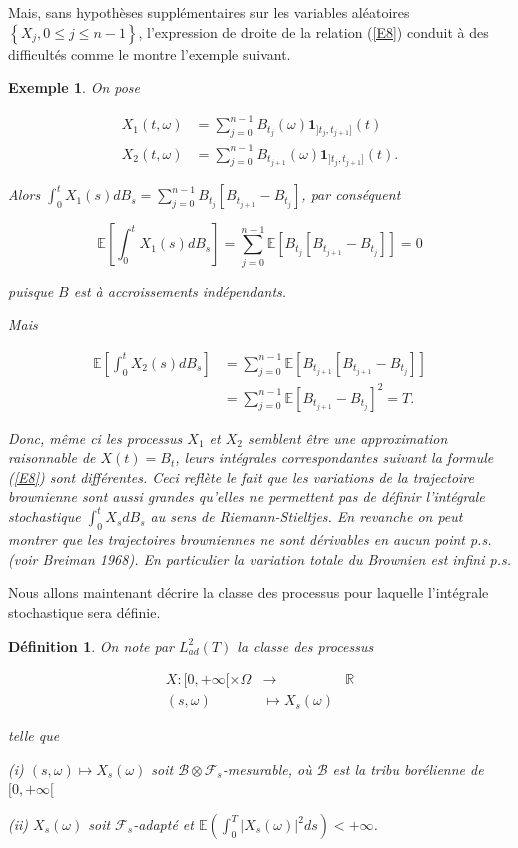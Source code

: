 \documentclass[A4paper,12pt]{report}
\newtheorem{definition}{D\'efinition}[chapter]
\newtheorem{example}{Exemple}[chapter]
\newcommand{\E}{{\mathbb{E}}}
\begin{document}
Mais, sans hypothèses supplémentaires sur les variables aléatoires $\left\{X_{j}, 0 \leq j \leq n-1\right\}$, l'expression de droite de la relation (\ref{E8}) conduit à des difficultés comme le montre l'exemple suivant.

\begin{example} On pose

$$
\begin{aligned}
X_{1}(t, \omega) & =\sum_{j=0}^{n-1} B_{t_{j}}(\omega) \mathbf{1}_{] t_{j}, t_{j+1}]}(t) \\
X_{2}(t, \omega) & =\sum_{j=0}^{n-1} B_{t_{j+1}}(\omega) \mathbf{1}_{] t_{j}, t_{j+1}]}(t) .
\end{aligned}
$$

Alors $\int_{0}^{t} X_{1}(s) d B_{s}=\sum_{j=0}^{n-1} B_{t_{j}}\left[B_{t_{j+1}}-B_{t_{j}}\right]$, par conséquent

$$
\E\left[\int_{0}^{t} X_{1}(s) d B_{s}\right]=\sum_{j=0}^{n-1} \E\left[B_{t_{j}}\left[B_{t_{j+1}}-B_{t_{j}}\right]\right]=0
$$

puisque $B$ est à accroissements indépendants.

Mais

$$
\begin{aligned}
\E\left[\int_{0}^{t} X_{2}(s) d B_{s}\right] & =\sum_{j=0}^{n-1} \E\left[B_{t_{j+1}}\left[B_{t_{j+1}}-B_{t_{j}}\right]\right] \\
& =\sum_{j=0}^{n-1} \E\left[B_{t_{j+1}}-B_{t_{j}}\right]^{2}=T .
\end{aligned}
$$

Donc, même ci les processus $X_{1}$ et $X_{2}$ semblent être une approximation raisonnable de $X(t)=B_{t}$, leurs intégrales correspondantes suivant la formule (\ref{E8}) sont différentes. Ceci reflète le fait que les variations de la trajectoire brownienne sont aussi grandes qu'elles ne permettent pas de définir l'intégrale stochastique $\int_{0}^{t} X_s d B_{s}$ au sens de Riemann-Stieltjes. En revanche on peut montrer que les trajectoires browniennes ne sont dérivables en aucun point p.s. (voir Breiman 1968). En particulier la variation totale du Brownien est infini p.s.
\end{example}
Nous allons maintenant décrire la classe des processus pour laquelle l'intégrale stochastique sera définie. 
\begin{definition}
On note par $L_{a d}^{2}(T)$ la classe des processus

$$
\begin{array}{rlc}
X:[0,+\infty[\times \Omega & \longrightarrow & \mathbb{R} \\
(s, \omega) & \longmapsto X_s(\omega)
\end{array}
$$

telle que

(i) $(s, \omega) \longmapsto X_s(\omega)$ soit $\mathcal{B} \otimes \mathcal{F}_{s}$-mesurable, où $\mathcal{B}$ est la tribu borélienne de $[0,+\infty[$

(ii) $ X_s(\omega)$ soit $\mathcal{F}_{s}$-adapté et $\E\left( \int_{0}^{T}| X_s(\omega)|^{2} d s\right)<+\infty$.
\end{definition}
\end{document}
